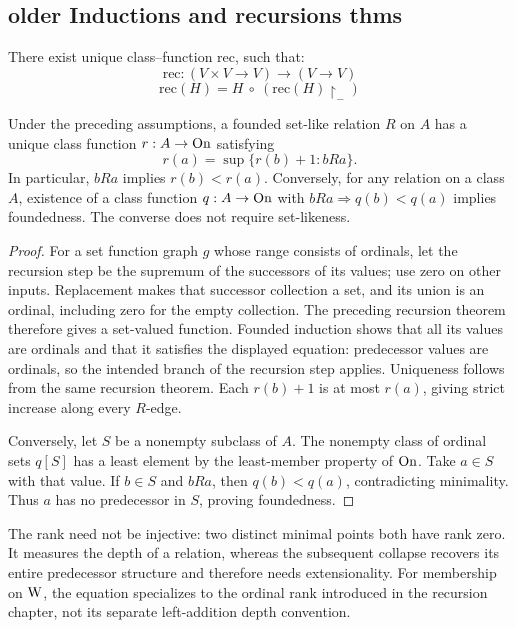 \subsection{older Inductions and recursions thms}%
There exist unique class--function rec, such that:
\[
\mbox{rec}:(V\times V\to V)\to(V\to V)
\]
\[
\mbox{rec}(H) = H\ \circ\ (\mbox{rec}(H)\restriction_-)
\]
\fi
\begin{theorem}
Under the preceding assumptions, a founded set-like relation $R$ on $A$
has a unique class function $r:A\to\mathrm{On}$ satisfying
\[
r(a)=\sup\{r(b)+1:bRa\}.
\]
In particular, $bRa$ implies $r(b)<r(a)$. Conversely, for any relation
on a class $A$, existence of a class function $q:A\to\mathrm{On}$ with
$bRa\Rightarrow q(b)<q(a)$ implies foundedness. The converse does not
require set-likeness.
\end{theorem}
\begin{proof}
For a set function graph $g$ whose range consists of ordinals, let the
recursion step be the supremum of the successors of its values; use zero
on other inputs. Replacement makes that successor collection a set, and
its union is an ordinal, including zero for the empty collection.
The preceding recursion theorem therefore gives a set-valued function.
Founded induction shows that all its values are ordinals and that it
satisfies the displayed equation: predecessor values are ordinals, so
the intended branch of the recursion step applies. Uniqueness follows
from the same recursion theorem. Each $r(b)+1$ is at most $r(a)$, giving
strict increase along every $R$-edge.

Conversely, let $S$ be a nonempty subclass of $A$. The nonempty class
of ordinal sets $q[S]$ has a least element by the least-member property
of $\mathrm{On}$. Take $a\in S$ with that value.
If $b\in S$ and $bRa$, then $q(b)<q(a)$, contradicting minimality.
Thus $a$ has no predecessor in $S$, proving foundedness.
\end{proof}

The rank need not be injective: two distinct minimal points both have
rank zero. It measures the depth of a relation, whereas the subsequent
collapse recovers its entire predecessor structure and therefore needs
extensionality. For membership on $\mathrm{W}$, the equation specializes to the
ordinal rank introduced in the recursion chapter, not its separate
left-addition depth convention.

